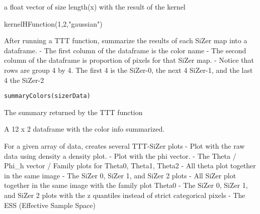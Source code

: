 \documentclass[letterpaper]{book}
\begin{document}
%
\begin{Value}
a float vector of size length(x) with the result of the kernel
\end{Value}
%
\begin{Examples}
\begin{ExampleCode}
kernelHFunction(1,2,"gaussian")

\end{ExampleCode}
\end{Examples}
%
\begin{Description}\relax
After running a TTT function, summarize the results of each SiZer map into a dataframe.
- The first column of the dataframe is the color name
- The second column of the dataframe is proportion of pixels for that SiZer map.
- Notice that rows are group 4 by 4. The first 4 is the SiZer-0, the next 4 SiZer-1, and the last 4 the SiZer-2
\end{Description}
%
\begin{Usage}
\begin{verbatim}
summaryColors(sizerData)
\end{verbatim}
\end{Usage}
%
\begin{Arguments}
\begin{ldescription}
\item[\code{sizerData}] The summary returned by the TTT function
\end{ldescription}
\end{Arguments}
%
\begin{Value}
A 12 x 2 dataframe with the color info summarized.
\end{Value}
%
\begin{Description}\relax
For a given array of data, creates several TTT-SiZer plots
- Plot with the raw data using density a density plot.
- Plot with the phi vector.
- The Theta / Phi\_h vector / Family plots for Theta0, Theta1, Theta2
- All theta plot together in the same image
- The SiZer 0, SiZer 1, and SiZer 2 plots
- All SiZer plot together in the same image with the family plot Theta0
- The SiZer 0, SiZer 1, and SiZer 2 plots with the z quantiles instead of strict categorical pixels
- The ESS (Effective Sample Space)
\end{Description}
\end{document}
